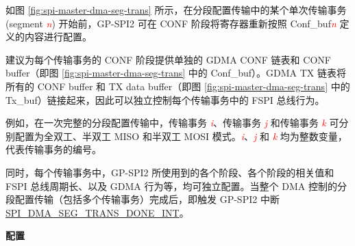 \documentclass[main\_\_CN.tex]{subfiles}
\begin{document}
如图 \ref{fig:spi-master-dma-seg-trans} 所示，在分段配置传输中的某个单次传输事务 (segment \textcolor{red}{\it{n}}) 开始前，GP-SPI2 可在 CONF 阶段将寄存器重新按照 Conf\_buf\textcolor{red}{\it{n}}  定义的内容进行配置。

建议为每个传输事务的 CONF 阶段提供单独的 GDMA CONF 链表和 CONF buffer（即图 \ref{fig:spi-master-dma-seg-trans} 中的 Conf\_buf）。GDMA TX 链表将所有的 CONF buffer 和 TX data buffer（即图 \ref{fig:spi-master-dma-seg-trans} 中的 Tx\_buf）链接起来，因此可以独立控制每个传输事务中的 FSPI 总线行为。

例如，在一次完整的分段配置传输中，传输事务 \textcolor{red}{\it i}、传输事务 \textcolor{red}{\it j} 和传输事务 \textcolor{red}{\it k} 可分别配置为全双工、半双工 MISO 和半双工 MOSI 模式。\textcolor{red}{\it i}、\textcolor{red}{\it j} 和 \textcolor{red}{\it k} 均为整数变量，代表传输事务的编号。 

同时，每个传输事务中，GP-SPI2 所使用到的各个阶段、各个阶段的相关值和 FSPI 总线周期长、以及 GDMA 行为等，均可独立配置。当整个 DMA 控制的分段配置传输（包括多个传输事务）完成后，即触发 GP-SPI2 中断 \hyperref[int:SPIDMASEGTRANSDONEINT]{SPI\_DMA\_SEG\_TRANS\_DONE\_INT}。

\textbf{配置}
\end{document}
